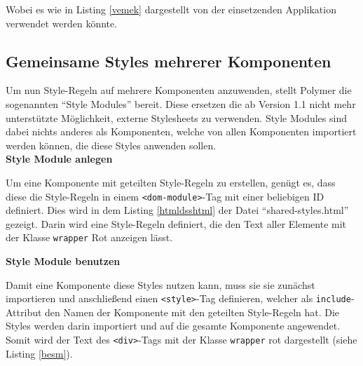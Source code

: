 

Wobei es wie in Listing \ref{vemek} dargestellt von der einsetzenden Applikation verwendet werden könnte.




\subsection{Gemeinsame Styles mehrerer Komponenten}\label{gemeinsame-styles-mehrerer-komponenten}

Um nun Style-Regeln auf mehrere Komponenten anzuwenden, stellt Polymer die sogenannten ``Style Modules'' bereit. Diese ersetzen die ab Version 1.1 nicht mehr unterstützte Möglichkeit, externe Stylesheets zu verwenden. Style Modules sind dabei nichts anderes als Komponenten, welche von allen Komponenten importiert werden können, die diese Styles anwenden sollen. \\


\textbf{Style Module anlegen}

Um eine Komponente mit geteilten Style-Regeln zu erstellen, genügt es, dass diese die Style-Regeln in einem \texttt{\textless{}dom-module\textgreater{}}-Tag mit einer beliebigen ID definiert. Dies wird in dem Listing \ref{htmldsshtml} der Datei ``shared-styles.html'' gezeigt. Darin wird eine Style-Regeln definiert, die den Text aller Elemente mit der Klasse \texttt{wrapper} Rot anzeigen lässt.




\textbf{Style Module benutzen}

Damit eine Komponente diese Styles nutzen kann, muss sie sie zunächst importieren und anschließend einen \texttt{\textless{}style\textgreater{}}-Tag definieren, welcher als \texttt{include}-Attribut den Namen der Komponente mit den geteilten Style-Regeln hat. Die Styles werden darin importiert und auf die gesamte Komponente angewendet. Somit wird der Text des \texttt{\textless{}div\textgreater{}}-Tags mit der Klasse \texttt{wrapper} rot dargestellt (siehe Listing \ref{besm}).




